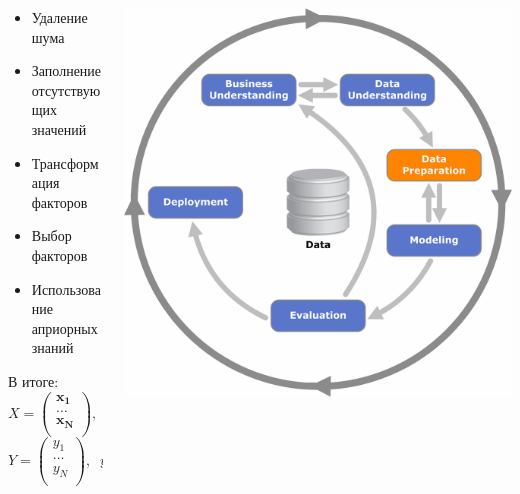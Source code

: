 \documentclass[10pt]{beamer}
\begin{document}
\begin{frame}{}

\begin{columns}[C]
    \begin{column}{.5\textwidth}
    \begin{itemize}
		\item Удаление шума
		\item Заполнение отсутствующих значений
		\item Трансформация факторов
		\item Выбор факторов
		\item Использование априорных знаний
	\end{itemize}
	\vspace{1em}
	В итоге:\\
	\[
	X = \begin{pmatrix}
	\mathbf{x_1} \\
	\ldots \\
	\mathbf{x_N} \\
	\end{pmatrix}, \;\; x_i \in \mathcal{X}
	\]
	\[
	Y = \begin{pmatrix}
	y_1 \\
	\ldots \\
	y_N \\
	\end{pmatrix}, \;\; y_i \in \mathcal{Y}
	\]
    \end{column}
       
    \begin{column}{.5\textwidth}
    \vspace{-0em}
	\begin{center}
   		\includegraphics[width=\textwidth]{images/crisp-dp.png}
    \end{center}
    \end{column}
  \end{columns}

\end{frame}
\end{document}

